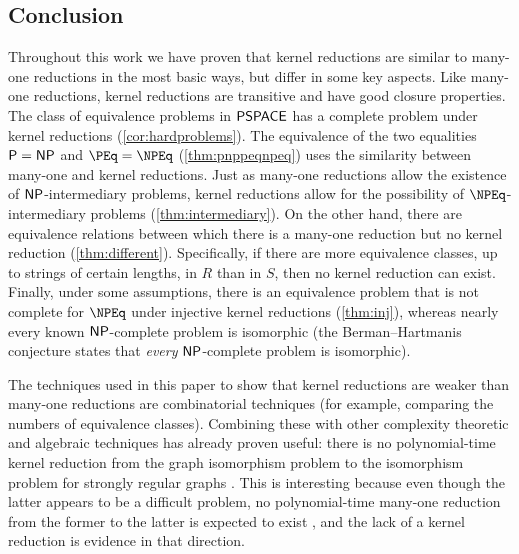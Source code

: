 \subsection{Conclusion}
%
Throughout this work we have proven that kernel reductions are similar to many-one reductions in the most basic ways, but differ in some key aspects.
Like many-one reductions, kernel reductions are transitive and have good closure properties.
The class of equivalence problems in ${\mathsf{PSPACE}}$ has a complete problem under kernel reductions (\autoref{cor:hardproblems}).
The equivalence of the two equalities ${\mathsf{P}} = {\mathsf{NP}}$ and $\PEq = \NPEq$ (\autoref{thm:pnppeqnpeq}) uses the similarity between many-one and kernel reductions.
Just as many-one reductions allow the existence of ${\mathsf{NP}}$-intermediary problems, kernel reductions allow for the possibility of $\NPEq$-intermediary problems (\autoref{thm:intermediary}).
On the other hand, there are equivalence relations between which there is a many-one reduction but no kernel reduction (\autoref{thm:different}).
Specifically, if there are more equivalence classes, up to strings of certain lengths, in $R$ than in $S$, then no kernel reduction can exist.
Finally, under some assumptions, there is an equivalence problem that is not complete for $\NPEq$ under injective kernel reductions (\autoref{thm:inj}), whereas nearly every known ${\mathsf{NP}}$-complete problem is isomorphic (the Berman--Hartmanis conjecture \autocite{bh77} states that \emph{every} ${\mathsf{NP}}$-complete problem is isomorphic).

The techniques used in this paper to show that kernel reductions are weaker than many-one reductions are combinatorial techniques (for example, comparing the numbers of equivalence classes).
Combining these with other complexity theoretic and algebraic techniques has already proven useful: there is no polynomial-time kernel reduction from the graph isomorphism problem to the isomorphism problem for strongly regular graphs \autocite[Theorem~22]{babai14}.
This is interesting because even though the latter appears to be a difficult problem, no polynomial-time many-one reduction from the former to the latter is expected to exist \autocite{babai14}, and the lack of a kernel reduction is evidence in that direction.

